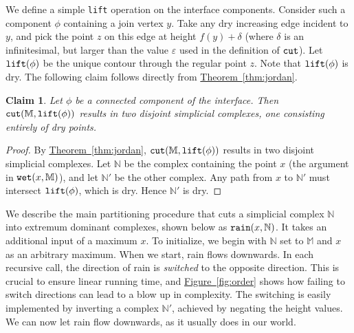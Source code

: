 \documentclass[11pt]{article}
\newtheorem{claim}[theorem]{Claim}
\theoremstyle{definition}
\newcommand{\MM}{\mathbb{M}}
\newcommand{\NN}{\mathbb{N}}
\newcommand{\eps}{\varepsilon}
\newcommand{\Sec}[1]{\hyperref[sec:#1]{\S\ref*{sec:#1}}} %
\newcommand{\Fig}[1]{\hyperref[fig:#1]{Figure~\ref*{fig:#1}}} %
\newcommand{\Thm}[1]{\hyperref[thm:#1]{Theorem~\ref*{thm:#1}}} %
\newcommand{\cut}{{\tt cut}}
\newcommand{\lift}{{\tt lift}}
\newcommand{\rain}{{\tt rain}}
\newcommand{\wet}{{\tt wet}}
\begin{document}
We define a simple \lift{} operation on the interface components. Consider such a component $\phi$ containing
a join vertex $y$. Take any dry increasing edge incident to $y$, and pick the point $z$ on this edge at height
$f(y) + \delta$ (where $\delta$ is an infinitesimal, but larger than the value $\eps$ used in the definition of $\cut$). 
Let $\lift(\phi)$ be the unique contour through the regular point $z$. Note that $\lift(\phi)$ is dry.
The following claim follows directly from \Thm{jordan}.

\begin{claim} \label{clm:cut-int} Let $\phi$ be a connected component of the interface. Then $\cut(\MM,\lift(\phi))$
results in two disjoint simplicial complexes, one consisting entirely of dry points.
\end{claim}

\begin{proof} By \Thm{jordan}, $\cut(\MM,\lift(\phi))$ results in two disjoint simplicial complexes. Let $\NN$ be the complex containing
the point $x$ (the argument in $\wet(x,\MM)$), and let $\NN'$ be the other complex. 
Any path from $x$ to $\NN'$ must intersect $\lift(\phi)$, which is dry. Hence $\NN'$ is dry.
%
%
\end{proof}

We describe the main partitioning procedure that cuts a simplicial complex $\NN$ into extremum
dominant complexes, shown below as $\rain(x,\NN)$. It takes an additional input of a maximum $x$. To initialize,
we begin with $\NN$ set to $\MM$ and $x$ as an arbitrary maximum. 
When we start, rain flows downwards. In each recursive call, the direction of rain is \emph{switched} to the 
opposite direction. This is crucial to ensure linear running time, and \Fig{order} shows how failing to switch 
directions can lead to a blow up in complexity. 
The switching is easily implemented by inverting a complex $\NN'$, achieved by negating the height values.
We can now let rain flow downwards, as it usually does in our world.
\end{document}
